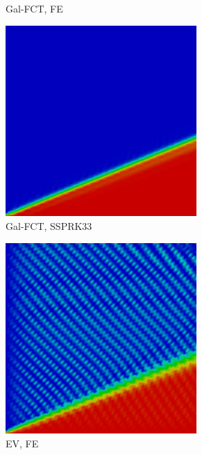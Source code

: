 \begin{frame}
\begin{figure}[h]
\begin{subfigure}{0.3\textwidth}
      \caption{Gal-FCT, FE}
   \end{subfigure}
   \begin{subfigure}{0.3\textwidth}
      \centering
      \includegraphics[width=0.8\textwidth]{./figures/glance_GalFCT_SSP3.png}
      \caption{Gal-FCT, SSPRK33}
   \end{subfigure}
   \begin{subfigure}{0.3\textwidth}
      \centering
      \includegraphics[width=0.8\textwidth]{./figures/glance_EV_FE_cE01.png}
      \caption{EV, FE}
   \end{subfigure}
   \begin{subfigure}{0.3\textwidth}

\end{subfigure}
\end{figure}
\end{frame}
